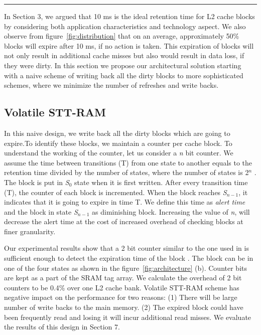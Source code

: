 
\begin{figure*} [t]
\center
 \hrule
 \caption{\label{fig:architecture} \scriptsize \bf A modified 16-way L2 cache architecture with a 2-bit counter and a small buffer}
\end{figure*}


In Section 3, we argued that 10 ms is the ideal retention time for L2 cache blocks by considering both application characteristics
and technology aspect. We also observe from figure~\ref{fig:distribution} that on an average, approximately 50\% blocks will 
expire after 10 ms, if no action is taken. This expiration of blocks will not only result in additional cache misses but also would
result in data loss, if they were dirty. In this section we propose our architectural solution starting with a naive scheme of writing back
all the dirty blocks to more sophisticated schemes, where we minimize the number of refreshes and write backs. 

\subsection{{Volatile STT-RAM}}
In this naive design, we write back all the dirty blocks which are going to expire.To identify these blocks, 
we maintain a counter per cache block.  To understand the working of the counter, let us consider a {\it n} bit
counter. We assume the time between transitions (T) from one state to another equals to the retention time divided by the number of states,
where the number of states is 2$^n$ .
The block is put in {\it S$_0$} state when it is first written. After every transition time (T), the counter of each block is incremented.
When the block reaches {\it S$_{n-1}$}, it indicates that it is going to expire in time T. 
We define this time as {\it alert time} and the block in state {\it S$_{n-1}$} as diminishing block. 
Increasing the value of {\it n}, will decrease the alert time at the cost of increased overhead of checking blocks at finer granularity. 

Our experimental results show that a 2 bit counter similar to the one used in \cite{marget} is sufficient enough to detect the expiration time of the block .
The block can be in one of the four states as shown in the figure~\ref{fig:architecture} (b). Counter bits are kept as a part of the SRAM tag array. 
We calculate the overhead of 2 bit counters to be 0.4\% over one L2 cache bank.  
Volatile STT-RAM scheme has negative impact on the performance for two reasons: (1) There will be large number of write backs to the main memory. 
(2) The expired block could have been frequently read and losing it will incur additional read misses. We evaluate the results of this design in Section 7.

